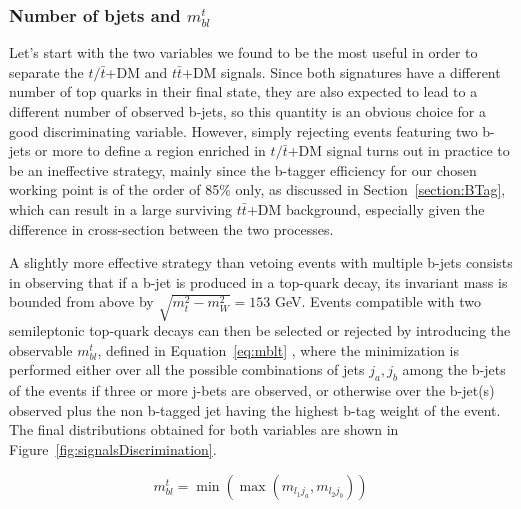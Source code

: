 \documentclass[a4paper, 10pt, openright]{report}
\begin{document}
\subsubsection*{Number of bjets and $m_{bl}^t$}

Let's start with the two variables we found to be the most useful in order to separate the $t/\bar t$+DM and $t \bar t$+DM signals. Since both signatures have a different number of top quarks in their final state, they are also expected to lead to a different number of observed b-jets, so this quantity is an obvious choice for a good discriminating variable. However, simply rejecting events featuring two b-jets or more to define a region enriched in $t/ \bar t$+DM signal turns out in practice to be an ineffective strategy, mainly since the b-tagger efficiency for our chosen working point is of the order of 85\% only, as discussed in Section~\ref{section:BTag}, which can result in a large surviving $t \bar t$+DM background, especially given the difference in cross-section between the two processes.

A slightly more effective strategy than vetoing events with multiple b-jets consists in observing that if a b-jet is produced in a top-quark decay, its invariant mass is bounded from above by $\sqrt{m_t^2 - m_{W}^2} = 153$ GeV. Events compatible with two semileptonic top-quark decays can then be selected or rejected by introducing the observable $m_{bl}^t$, defined in Equation~\ref{eq:mblt} \cite{mblt}, where the minimization is performed either over all the possible combinations of jets {$j_a, j_b$} among the b-jets of the events if three or more j-bets are observed, or otherwise over the b-jet(s) observed plus the non b-tagged jet having the highest b-tag weight of the event. The final distributions obtained for both variables are shown in Figure~\ref{fig:signalsDiscrimination}.

\begin{equation}
\label{eq:mblt}
m_{bl}^t = \min \left (\max(m_{l_1 j_a}, m_{l_2 j_b}) \right)
\end{equation}
\end{document}
